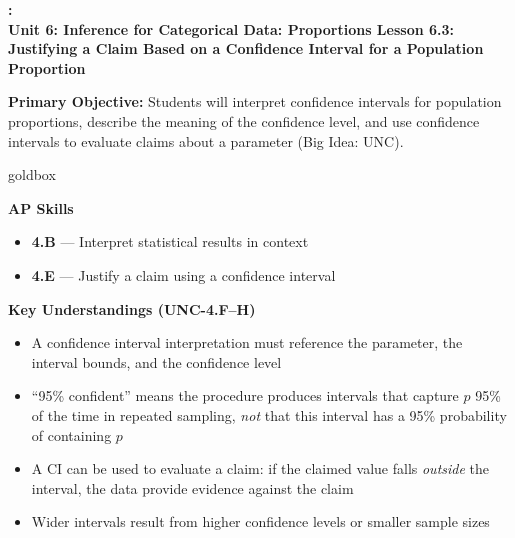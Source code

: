 \documentclass[10pt]{article}
\newcommand{\UnitNumberName}{Unit 6: Inference for Categorical Data: Proportions \quad}
\newcommand{\LessonNumberName}{Lesson 6.3: Justifying a Claim Based on a Confidence Interval for a Population Proportion}
\begin{document}
\begin{center}
    {\Large\bfseries \CourseName: \SchoolYear \\
    {\small\bfseries \UnitNumberName \LessonNumberName}}
\end{center}

\begin{tcolorbox}[colback=sky, colframe=navy, boxrule=0.9pt, arc=2mm,
    left=2mm, right=2mm, top=1.5mm, bottom=1.5mm]
    \textbf{Primary Objective:} Students will interpret confidence intervals for population
    proportions, describe the meaning of the confidence level, and use confidence intervals
    to evaluate claims about a parameter (Big Idea: UNC).
\end{tcolorbox}

\renewcommand{\arraystretch}{1.6}
\begin{skillbox}{goldbox}
    \begin{minipage}[t]{0.48\linewidth}\vspace{0pt}
        \textbf{AP Skills}
        \begin{itemize}[leftmargin=1.2em]
            \item \textbf{4.B} --- Interpret statistical results in context
            \item \textbf{4.E} --- Justify a claim using a confidence interval
        \end{itemize}
    \end{minipage}\hfill
    \begin{minipage}[t]{0.48\linewidth}\vspace{0pt}
        \textbf{Key Understandings (UNC-4.F--H)}
        \begin{itemize}[leftmargin=1.2em]
            \item A confidence interval interpretation must reference the parameter, the interval bounds, and the confidence level
            \item ``95\% confident'' means the procedure produces intervals that capture $p$ 95\% of the time in repeated sampling, \textit{not} that this interval has a 95\% probability of containing $p$
            \item A CI can be used to evaluate a claim: if the claimed value falls \emph{outside} the interval, the data provide evidence against the claim
            \item Wider intervals result from higher confidence levels or smaller sample sizes
        \end{itemize}
    \end{minipage}
\end{skillbox}
\end{document}
